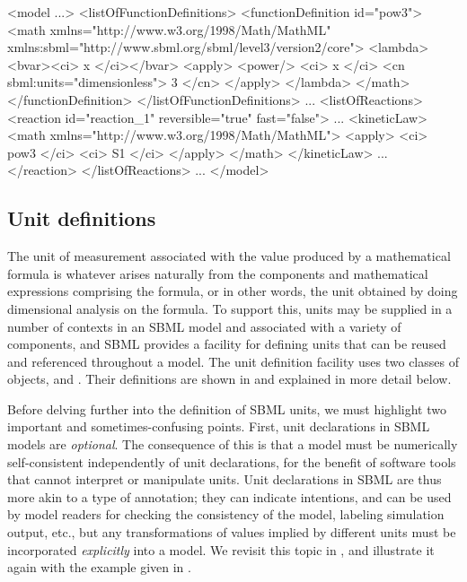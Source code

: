 \begin{example}
<model ...>
   <listOfFunctionDefinitions>
       <functionDefinition id="pow3">
           <math xmlns="http://www.w3.org/1998/Math/MathML"
                 xmlns:sbml="http://www.sbml.org/sbml/level3/version2/core">
               <lambda>
                   <bvar><ci> x </ci></bvar>
                   <apply>
                       <power/>
                       <ci> x </ci>
                       <cn sbml:units="dimensionless"> 3 </cn> 
                   </apply>
               </lambda>
           </math>
       </functionDefinition>
   </listOfFunctionDefinitions>
   ...
   <listOfReactions>
       <reaction id="reaction_1" reversible="true" fast="false">
           ...
           <kineticLaw>
               <math xmlns="http://www.w3.org/1998/Math/MathML">
                   <apply> 
                       <ci> pow3 </ci>
                       <ci> S1 </ci> 
                   </apply>
               </math>
           </kineticLaw>
           ...
       </reaction>
   </listOfReactions>
   ...
</model>\end{example}


\subsection{Unit definitions}
\label{sec:unitdefinitions}

The unit of measurement associated with the value produced by a
mathematical formula is whatever arises naturally from the
components and mathematical expressions comprising the formula, or
in other words, the unit obtained by doing dimensional analysis on
the formula.  To support this, units may be supplied in a number
of contexts in an SBML model and associated with a variety of
components, and SBML provides a facility for defining units that
can be reused and referenced throughout a model.  The unit
definition facility uses two classes of objects, \UnitDefinition
and \Unit.  Their definitions are shown in
 and explained in more detail
below.

Before delving further into the definition of SBML units, we must
highlight two important and sometimes-confusing points.  First,
unit declarations in SBML models are \emph{optional}.  The
consequence of this is that a model must be numerically
self-consistent independently of unit declarations, for the
benefit of software tools that cannot interpret or manipulate
units.  Unit declarations in SBML are thus more akin to a type of
annotation; they can indicate intentions, and can be used by model
readers for checking the consistency of the model, labeling
simulation output, etc., but any transformations of values implied
by different units must be incorporated \emph{explicitly} into a
model.  We revisit this topic in ,
and illustrate it again with the example given in
.

